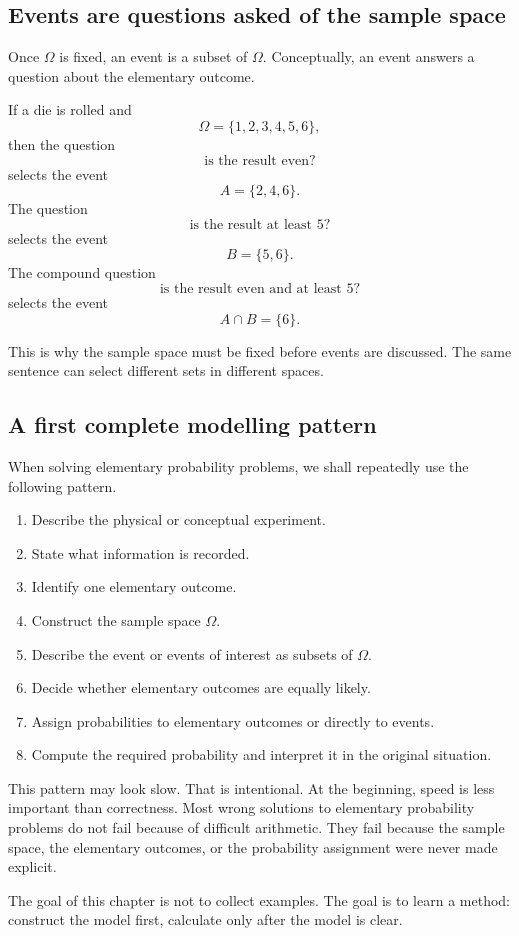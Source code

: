 \subsection*{Events are questions asked of the sample space}

Once \(\Omega\) is fixed, an event is a subset of \(\Omega\). Conceptually, an
event answers a question about the elementary outcome.

\begin{examplebox}
If a die is rolled and
\[
\Omega=\{1,2,3,4,5,6\},
\]
then the question
\[
\text{is the result even?}
\]
selects the event
\[
A=\{2,4,6\}.
\]
The question
\[
\text{is the result at least }5?
\]
selects the event
\[
B=\{5,6\}.
\]
The compound question
\[
\text{is the result even and at least }5?
\]
selects the event
\[
A\cap B=\{6\}.
\]
\end{examplebox}

This is why the sample space must be fixed before events are discussed. The same
sentence can select different sets in different spaces.

\subsection*{A first complete modelling pattern}

When solving elementary probability problems, we shall repeatedly use the
following pattern.

\begin{enumerate}
    \item Describe the physical or conceptual experiment.
    \item State what information is recorded.
    \item Identify one elementary outcome.
    \item Construct the sample space \(\Omega\).
    \item Describe the event or events of interest as subsets of \(\Omega\).
    \item Decide whether elementary outcomes are equally likely.
    \item Assign probabilities to elementary outcomes or directly to events.
    \item Compute the required probability and interpret it in the original situation.
\end{enumerate}

This pattern may look slow. That is intentional. At the beginning, speed is less
important than correctness. Most wrong solutions to elementary probability
problems do not fail because of difficult arithmetic. They fail because the
sample space, the elementary outcomes, or the probability assignment were never
made explicit.

\begin{remarkbox}
The goal of this chapter is not to collect examples. The goal is to learn a
method: construct the model first, calculate only after the model is clear.
\end{remarkbox}
